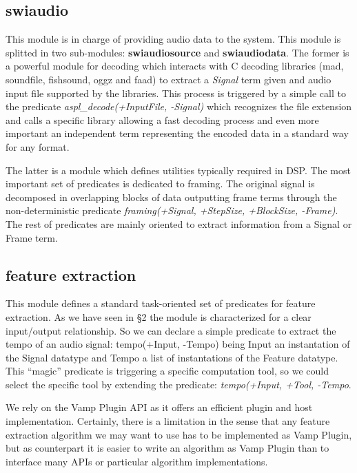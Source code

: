 \documentclass{llncs}
\begin{document}
\subsection{swiaudio}

This module is in charge of providing audio data to the system. This module is splitted in two sub-modules: \textbf{swiaudiosource} and \textbf{swiaudiodata}. The former is a powerful module for decoding which interacts with C decoding libraries (mad, soundfile, fishsound, oggz and faad) to extract a \textit{Signal} term given and audio input file supported by the libraries. This process is triggered by a simple call to the predicate \textit{aspl\_decode(+InputFile, -Signal)} which recognizes the file extension and calls a specific library allowing a fast decoding process and even more important an independent term representing the encoded data in a standard way for any format.

The latter is a module which defines utilities typically required in DSP. The most important set of predicates is dedicated to framing. The original signal is decomposed in overlapping blocks of data outputting frame terms through the non-deterministic predicate \textit{framing(+Signal, +StepSize, +BlockSize, -Frame)}. The rest of predicates are mainly oriented to extract information from a Signal or Frame term.
 
\subsection{feature extraction}

This module defines a standard task-oriented set of predicates for feature extraction. As we have seen in \S 2 the module is characterized for a clear input/output relationship. So we can declare a simple predicate to extract the tempo of an audio signal: tempo(+Input, -Tempo) being Input an instantation of the Signal datatype and Tempo a list of instantations of the Feature datatype. This ``magic'' predicate is triggering a specific computation tool, so we could select the specific tool by extending the predicate: \textit{tempo(+Input, +Tool, -Tempo}.

We rely on the Vamp Plugin API as it offers an efficient plugin and host implementation. Certainly, there is a limitation in the sense that any feature extraction algorithm we may want to use has to be implemented as Vamp Plugin, but as counterpart it is easier to write an algorithm as Vamp Plugin than to interface many APIs or particular algorithm implementations.
\end{document}
